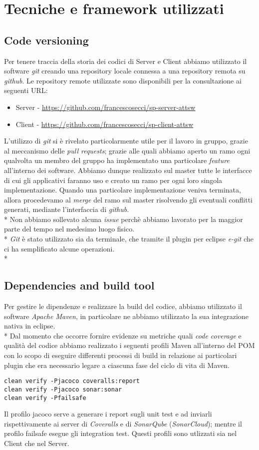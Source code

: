 \chapter{Tecniche e framework utilizzati}
\section{Code versioning}
Per tenere traccia della storia dei codici di Server e Client abbiamo utilizzato il software \emph{git} creando una repository locale connessa a una repository remota su \emph{github}. Le repository remote utilizzate sono disponibili per la consultazione ai seguenti URL:
\begin{itemize}
	\item Server - \url{https://github.com/francescosecci/sp-server-attsw}
	\item Client - \url{https://github.com/francescosecci/sp-client-attsw}
\end{itemize}
L'utilizzo di \emph{git} si \`e rivelato particolarmente utile per il lavoro in gruppo, grazie al meccanismo delle \emph{pull requests}; grazie alle quali abbiamo aperto un ramo ogni qualvolta un membro del gruppo ha implementato una particolare \emph{feature} all'interno dei software. Abbiamo dunque realizzato sul master tutte le interfacce di cui gli applicativi faranno uso e creato un ramo per ogni loro singola implementazione. Quando una particolare implementazione veniva terminata, allora procedevamo al \emph{merge} del ramo sul master risolvendo gli eventuali conflitti generati, mediante l'interfaccia di \emph{github}.\\*
Non abbiamo sollevato alcuna \emph{issue} perch\`e abbiamo lavorato per la maggior parte del tempo nel medesimo luogo fisico.\\*
\emph{Git} \`e stato utilizzato sia da terminale, che tramite il plugin per eclipse \emph{e-git} che ci ha semplificato alcune operazioni.\\*
\section{Dependencies and build tool}
Per gestire le dipendenze e realizzare la build del codice, abbiamo utilizzato il software \emph{Apache Maven}, in particolare ne abbiamo utilizzato la sua integrazione nativa in eclipse.\\*
Dal momento che occorre fornire evidenze su metriche quali \emph{code coverage} e qualit\`a del codice abbiamo realizzato i seguenti profili Maven all'interno del POM con lo scopo di eseguire differenti processi di build in relazione ai particolari plugin che era necessario legare a ciascuna fase del ciclo di vita di Maven.
\begin{lstlisting}
clean verify -Pjacoco coveralls:report
clean verify -Pjacoco sonar:sonar
clean verify -Pfailsafe
\end{lstlisting}
Il profilo jacoco serve a generare i report sugli unit test e ad inviarli rispettivamente ai server di \emph{Coveralls} e di \emph{SonarQube} (\emph{SonarCloud}); mentre il profilo failsafe esegue gli integration test. Questi profili sono utlizzati sia nel Client che nel Server.
